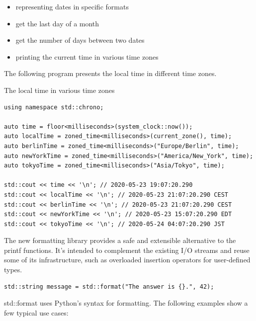 \begin{itemize}
\item 
representing dates in specific formats

\item 
get the last day of a month

\item 
get the number of days between two dates

\item 
printing the current time in various time zones
\end{itemize}

The following program presents the local time in different time zones.

\noindent
The local time in various time zones
\begin{lstlisting}[style=styleCXX]
using namespace std::chrono;

auto time = floor<milliseconds>(system_clock::now());
auto localTime = zoned_time<milliseconds>(current_zone(), time);
auto berlinTime = zoned_time<milliseconds>("Europe/Berlin", time);
auto newYorkTime = zoned_time<milliseconds>("America/New_York", time);
auto tokyoTime = zoned_time<milliseconds>("Asia/Tokyo", time);

std::cout << time << '\n'; // 2020-05-23 19:07:20.290
std::cout << localTime << '\n'; // 2020-05-23 21:07:20.290 CEST
std::cout << berlinTime << '\n'; // 2020-05-23 21:07:20.290 CEST
std::cout << newYorkTime << '\n'; // 2020-05-23 15:07:20.290 EDT
std::cout << tokyoTime << '\n'; // 2020-05-24 04:07:20.290 JST
\end{lstlisting}


The new formatting library provides a safe and extensible alternative to the printf functions. It’s intended to complement the existing I/O streams and reuse some of its infrastructure, such as overloaded insertion operators for user-defined types.

\begin{lstlisting}[style=styleCXX]
std::string message = std::format("The answer is {}.", 42);
\end{lstlisting}

std::format uses Python’s syntax for formatting. The following examples show a few typical use cases:

